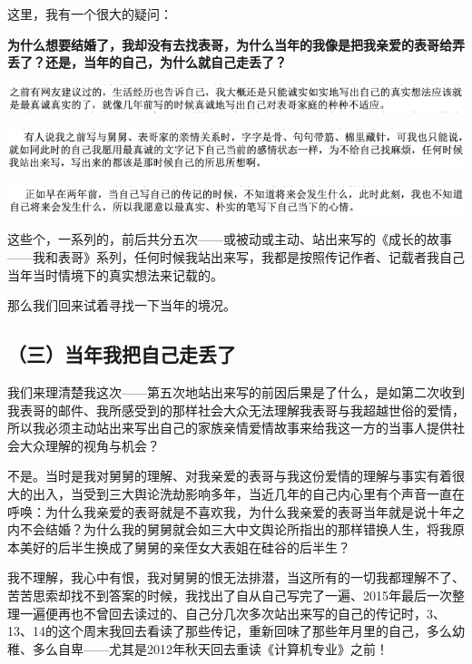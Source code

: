 \documentclass[9pt, b5paper]{article}
\begin{document}
这里，我有一个很大的疑问：

\textbf{为什么想要结婚了，我却没有去找表哥，为什么当年的我像是把我亲爱的表哥给弄丢了？还是，当年的自己，为什么就自己走丢了？}

\begin{center}
\includegraphics[width=.9\linewidth]{./pic/backups_plans_20210426_112108.png}
\end{center}

\begin{center}
\includegraphics[width=.9\linewidth]{./pic/backups_plans_20210426_114722.png}
\end{center}

\begin{center}
\includegraphics[width=.9\linewidth]{./pic/backups_plans_20210426_114834.png}
\end{center}

这些个，一系列的，前后共分五次——或被动或主动、站出来写的《成长的故事——我和表哥》系列，任何时候我站出来写，我都是按照传记作者、记载者我自己当年当时情境下的真实想法来记载的。

那么我们回来试着寻找一下当年的境况。

\subsection{（三）当年我把自己走丢了}
\label{sec:org496469c}

我们来理清楚我这次——第五次地站出来写的前因后果是了什么，是如第二次收到我表哥的邮件、我所感受到的那样社会大众无法理解我表哥与我超越世俗的爱情，所以我必须主动站出来写出自己的家族亲情爱情故事来给我这一方的当事人提供社会大众理解的视角与机会？

不是。当时是我对舅舅的理解、对我亲爱的表哥与我这份爱情的理解与事实有着很大的出入，当受到三大舆论洗劫影响多年，当近几年的自己内心里有个声音一直在呼唤：为什么我亲爱的表哥就是不喜欢我，为什么我亲爱的表哥当年就是说十年之内不会结婚？为什么我的舅舅就会如三大中文舆论所指出的那样错换人生，将我原本美好的后半生换成了舅舅的亲侄女大表姐在硅谷的后半生？

我不理解，我心中有恨，我对舅舅的恨无法排潜，当这所有的一切我都理解不了、苦苦思索却找不到答案的时候，我找出了自从自己写完了一遍、2015年最后一次整理一遍便再也不曾回去读过的、自己分几次多次站出来写的自己的传记时，3、13、14的这个周末我回去看读了那些传记，重新回味了那些年月里的自己，多么幼稚、多么自卑——尤其是2012年秋天回去重读《计算机专业》之前！
\end{document}
